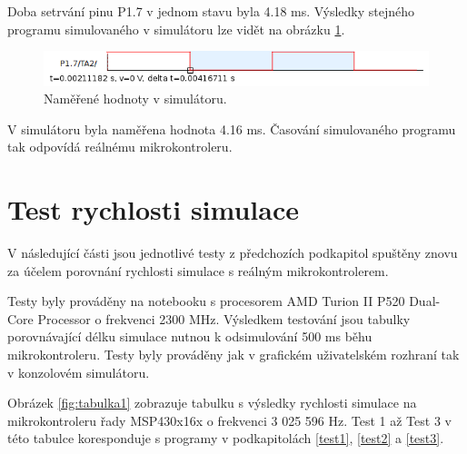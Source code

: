 Doba setrvání pinu P1.7 v jednom stavu byla 4.18 ms. Výsledky stejného programu simulovaného v simulátoru lze vidět na obrázku \ref{fig:dso06sim}.

\begin{figure}[ht]
\centering
\includegraphics[trim=0cm 0cm 0cm 0cm, scale=0.8]{fig/dso06sim}
\caption{Naměřené hodnoty v simulátoru.}
\label{fig:dso06sim}
\end{figure}

V simulátoru byla naměřena hodnota 4.16 ms. Časování simulovaného programu tak odpovídá reálnému mikrokontroleru.

\section{Test rychlosti simulace}

V následující části jsou jednotlivé testy z předchozích podkapitol spuštěny znovu za účelem porovnání rychlosti simulace s reálným mikrokontrolerem.

Testy byly prováděny na notebooku s procesorem AMD Turion II P520 Dual-Core Processor o frekvenci 2300 MHz. Výsledkem testování jsou tabulky porovnávající délku simulace nutnou k odsimulování 500 ms běhu mikrokontroleru. Testy byly prováděny jak v grafickém uživatelském rozhraní tak v konzolovém simulátoru.

Obrázek \ref{fig:tabulka1} zobrazuje tabulku s výsledky rychlosti simulace na mikrokontroleru řady MSP430x16x o frekvenci 3 025 596 Hz. Test 1 až Test 3 v této tabulce koresponduje s programy v podkapitolách \ref{test1}, \ref{test2} a \ref{test3}.

